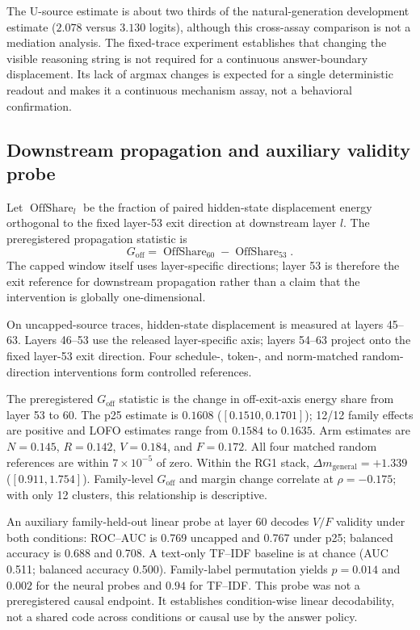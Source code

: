 \documentclass[letterpaper]{article}
\begin{document}
The U-source estimate is about two thirds of the natural-generation development estimate ($2.078$ versus $3.130$ logits), although this cross-assay comparison is not a mediation analysis.  The fixed-trace experiment establishes that changing the visible reasoning string is not required for a continuous answer-boundary displacement.  Its lack of argmax changes is expected for a single deterministic readout and makes it a continuous mechanism assay, not a behavioral confirmation.

\subsection{Downstream propagation and auxiliary validity probe}

Let $\operatorname{OffShare}_l$ be the fraction of paired hidden-state displacement energy orthogonal to the fixed layer-53 exit direction at downstream layer $l$.  The preregistered propagation statistic is
\begin{equation}
G_{\mathrm{off}}=\operatorname{OffShare}_{60}-\operatorname{OffShare}_{53}.
\end{equation}
The capped window itself uses layer-specific directions; layer 53 is therefore the exit reference for downstream propagation rather than a claim that the intervention is globally one-dimensional.

On uncapped-source traces, hidden-state displacement is measured at layers 45--63.  Layers 46--53 use the released layer-specific axis; layers 54--63 project onto the fixed layer-53 exit direction.  Four schedule-, token-, and norm-matched random-direction interventions form controlled references.

The preregistered $G_{\mathrm{off}}$ statistic is the change in off-exit-axis energy share from layer 53 to 60.  The p25 estimate is $0.1608$ ($[0.1510,0.1701]$); 12/12 family effects are positive and LOFO estimates range from $0.1584$ to $0.1635$.  Arm estimates are $N=0.145$, $R=0.142$, $V=0.184$, and $F=0.172$.  All four matched random references are within $7\times10^{-5}$ of zero.  Within the RG1 stack, $\Delta m_{\mathrm{general}}=+1.339$ ($[0.911,1.754]$).  Family-level $G_{\mathrm{off}}$ and margin change correlate at $\rho=-0.175$; with only 12 clusters, this relationship is descriptive.

An auxiliary family-held-out linear probe at layer 60 decodes $V/F$ validity under both conditions: ROC--AUC is 0.769 uncapped and 0.767 under p25; balanced accuracy is 0.688 and 0.708.  A text-only TF--IDF baseline is at chance (AUC 0.511; balanced accuracy 0.500).  Family-label permutation yields $p=0.014$ and $0.002$ for the neural probes and $0.94$ for TF--IDF.  This probe was not a preregistered causal endpoint.  It establishes condition-wise linear decodability, not a shared code across conditions or causal use by the answer policy.
\end{document}
